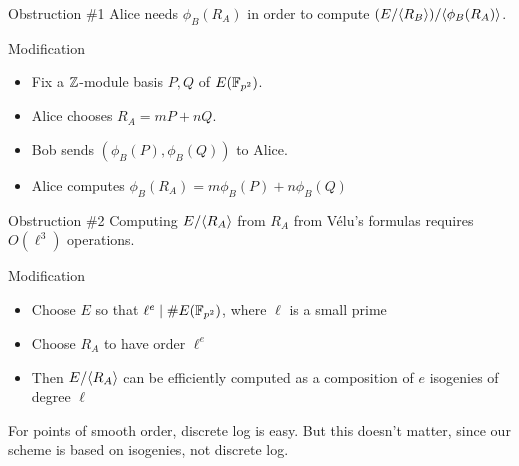 \documentclass{beamer}
\begin{document}
\begin{frame}
\begin{block}{Obstruction \#1}
Alice needs $\phi_B(R_A)$ in order to compute
$(E/\langle R_B\rangle)/\langle\phi_B(R_A)\rangle$.
\end{block}
\begin{block}{Modification}
\begin{itemize}
\item Fix a $\mathbb{Z}$-module basis $P,Q$ of $E(\mathbb{F}_{p^2})$.
\item Alice chooses $R_A = mP + nQ$.
\item Bob sends $(\phi_B(P),\phi_B(Q))$ to Alice.
\item Alice computes $\phi_B(R_A) = m\phi_B(P) + n\phi_B(Q)$
\end{itemize}
\end{block}
\end{frame}

\begin{frame}
\begin{block}{Obstruction \#2}
Computing $E/\langle R_A\rangle$ from $R_A$ from V\'elu's formulas requires
$O(\ell^3)$ operations.
\end{block}
\begin{block}{Modification}
\begin{itemize}
\item Choose $E$ so that $\ell^e \mid \#E(\mathbb{F}_{p^2})$, where $\ell$ is
  a small prime
\item Choose $R_A$ to have order $\ell^e$
\item Then $E/\langle R_A\rangle$ can be efficiently computed as a composition of
  $e$ isogenies of degree $\ell$
\end{itemize}
\end{block}
For points of smooth order, discrete log is easy. But this doesn't
matter, since our scheme is based on isogenies, not discrete log.
\end{frame}
\end{document}
